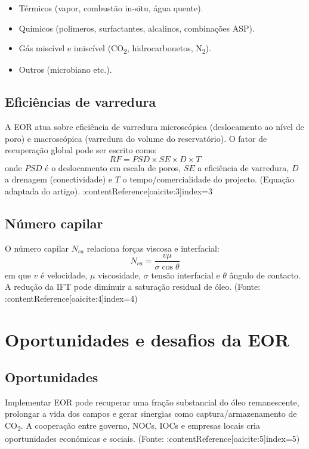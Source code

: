 \documentclass[11pt,a4paper]{article}
\begin{document}
\begin{itemize}[noitemsep]
  \item Térmicos (vapor, combustão in-situ, água quente).
  \item Químicos (polímeros, surfactantes, alcalinos, combinações ASP).
  \item Gás miscível e imiscível (CO\textsubscript{2}, hidrocarbonetos, N\textsubscript{2}).
  \item Outros (microbiano etc.).
\end{itemize}

\subsection{Eficiências de varredura}
A EOR atua sobre eficiência de varredura microscópica (deslocamento ao nível de poro) e macroscópica (varredura do volume do reservatório). O fator de recuperação global pode ser escrito como:
\begin{equation}
RF = PSD \times SE \times D \times T
\end{equation}
onde \(PSD\) é o deslocamento em escala de poros, \(SE\) a eficiência de varredura, \(D\) a drenagem (conectividade) e \(T\) o tempo/comercialidade do projecto. (Equação adaptada do artigo). :contentReference[oaicite:3]{index=3}

\subsection{Número capilar}
O número capilar \(N_{ca}\) relaciona forças viscosa e interfacial:
\begin{equation}
N_{ca} = \frac{v \mu}{\sigma \cos\theta}
\end{equation}
em que \(v\) é velocidade, \(\mu\) viscosidade, \(\sigma\) tensão interfacial e \(\theta\) ângulo de contacto. A redução da IFT pode diminuir a saturação residual de óleo. (Fonte: :contentReference[oaicite:4]{index=4})

\section{Oportunidades e desafios da EOR}
\subsection{Oportunidades}
Implementar EOR pode recuperar uma fração substancial do óleo remanescente, prolongar a vida dos campos e gerar sinergias como captura/armazenamento de CO\textsubscript{2}. A cooperação entre governo, NOCs, IOCs e empresas locais cria oportunidades económicas e sociais. (Fonte: :contentReference[oaicite:5]{index=5})
\end{document}
